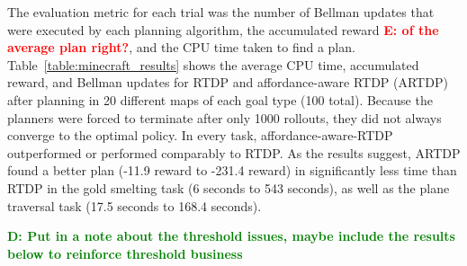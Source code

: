 \documentclass[conference]{IEEEtran}
\newcommand{\dnote}[1]{\textcolor{Green}{\textbf{D: #1}}}
\newcommand{\enote}[1]{\textcolor{Red}{\textbf{E: #1}}}
\begin{document}
The evaluation metric for each trial was the number of Bellman updates
that were executed by each planning algorithm, the accumulated reward \enote{of the average plan right?},
and the CPU time taken to find a plan.
Table~\ref{table:minecraft_results} shows the average CPU time, accumulated reward, and Bellman updates 
for RTDP and affordance-aware RTDP (ARTDP) after planning in 20 different maps of each goal type (100 total).
Because the planners were forced to terminate after only 1000 rollouts, they did not always converge to the optimal policy.
In every task, affordance-aware-RTDP outperformed or performed comparably to RTDP. As the results suggest,
ARTDP found a better plan (-11.9 reward to -231.4 reward) in significantly less time than RTDP in the gold smelting
task (6 seconds to 543 seconds), as well as the plane traversal task (17.5 seconds to 168.4 seconds).

\dnote{Put in a note about the threshold issues, maybe include the results below to reinforce threshold business}


\end{document}
